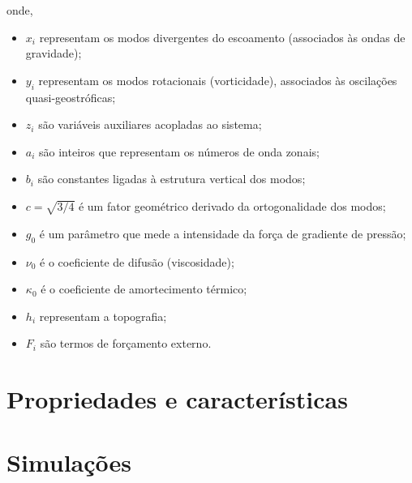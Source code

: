 onde,
\begin{itemize}
    \item $x_i$ representam os modos divergentes do escoamento (associados às ondas de gravidade);
    \item $y_i$ representam os modos rotacionais (vorticidade), associados às oscilações quasi-geostróficas;
    \item $z_i$ são variáveis auxiliares acopladas ao sistema;
    \item $a_i$ são inteiros que representam os números de onda zonais;
    \item $b_i$ são constantes ligadas à estrutura vertical dos modos;
    \item $c = \sqrt{3/4}$ é um fator geométrico derivado da ortogonalidade dos modos;
    \item $g_0$ é um parâmetro que mede a intensidade da força de gradiente de pressão;
    \item $\nu_0$ é o coeficiente de difusão (viscosidade);
    \item $\kappa_0$ é o coeficiente de amortecimento térmico;
    \item $h_i$ representam a topografia;
    \item $F_i$ são termos de forçamento externo.
\end{itemize}

\section{Propriedades e características}

\section{Simulações}